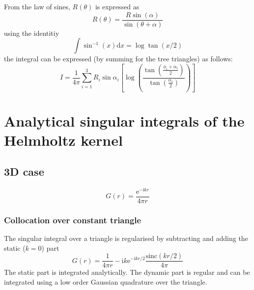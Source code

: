 \documentclass[a4paper,10pt,twocolumn]{article}
\newcommand{\td}{\mathrm{d}}
\newcommand{\te}{\mathrm{e}}
\newcommand{\ti}{\mathrm{i}}
\newcommand{\sinc}{\mathrm{sinc}}
\begin{document}

From the law of sines, $R(\theta)$ is expressed as
%
\begin{equation}
R(\theta) = \frac{R \sin(\alpha)}{\sin(\theta+\alpha)}
\end{equation}
%
using the identitiy
%
\begin{equation}
\int \sin^{-1}(x) \td x = \log \tan (x/2)
\end{equation}
%
the integral can be expressed (by summing for the tree triangles) as follows:
%
\begin{equation}
I = \frac{1}{4\pi} \sum_{i = 1}^3
R_i \sin\alpha_i \left[ \log \left( \frac{\tan\left(\frac{\phi_i+\alpha_i}{2}\right)}{\tan\left(\frac{\alpha_i}{2}\right)}\right)\right]
\end{equation}


\section{Analytical singular integrals of the Helmholtz kernel}

\subsection{3D case}

\begin{equation}
G(r) = \frac{\te^{-\ti k r}}{4\pi r}
\end{equation}

\subsubsection{Collocation over constant triangle}

The singular integral over a triangle is regularised by subtracting and adding the static ($k = 0$) part
%
\begin{equation}
G(r) = \frac{1}{4\pi r} -\ti k \te^{-\ti k r/2} \frac{\sinc(k r/2)}{4\pi}
\end{equation}
%
The static part is integrated analytically.
The dynamic part is regular and can be integrated using a low order Gaussian quadrature over the triangle.
\end{document}
